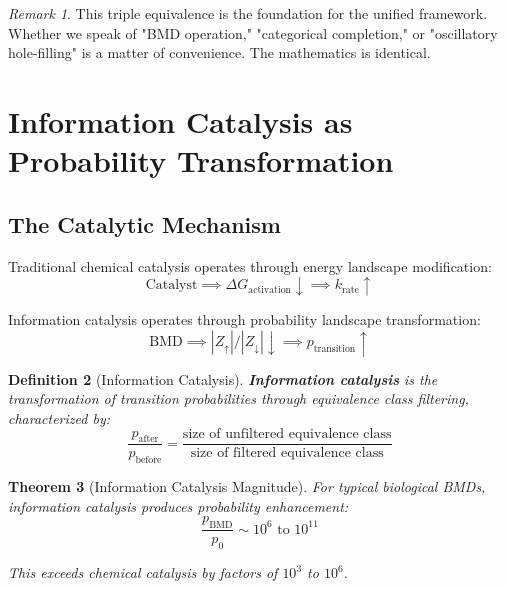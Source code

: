 \documentclass[11pt]{article}
\newtheorem{theorem}{Theorem}[section]
\newtheorem{definition}[theorem]{Definition}
\theoremstyle{remark}
\newtheorem{remark}[theorem]{Remark}
\begin{document}
\begin{remark}
This triple equivalence is the foundation for the unified framework. Whether we speak of "BMD operation," "categorical completion," or "oscillatory hole-filling" is a matter of convenience. The mathematics is identical.
\end{remark}

\section{Information Catalysis as Probability Transformation}

\subsection{The Catalytic Mechanism}

Traditional chemical catalysis operates through energy landscape modification:
\begin{equation}
\text{Catalyst} \implies \Delta G_{\text{activation}} \downarrow \implies k_{\text{rate}} \uparrow
\end{equation}

Information catalysis operates through probability landscape transformation:
\begin{equation}
\text{BMD} \implies |Z_{\uparrow}|/|Z_{\downarrow}| \downarrow \implies p_{\text{transition}} \uparrow
\end{equation}

\begin{definition}[Information Catalysis]
\label{def:info_catalysis}
\textbf{Information catalysis} is the transformation of transition probabilities through equivalence class filtering, characterized by:
\begin{equation}
\frac{p_{\text{after}}}{p_{\text{before}}} = \frac{\text{size of unfiltered equivalence class}}{\text{size of filtered equivalence class}}
\end{equation}
\end{definition}

\begin{theorem}[Information Catalysis Magnitude]
\label{thm:info_cat_magnitude}
For typical biological BMDs, information catalysis produces probability enhancement:
\begin{equation}
\frac{p_{\text{BMD}}}{p_0} \sim 10^6 \text{ to } 10^{11}
\end{equation}

This exceeds chemical catalysis by factors of $10^3$ to $10^6$.
\end{theorem}
\end{document}
